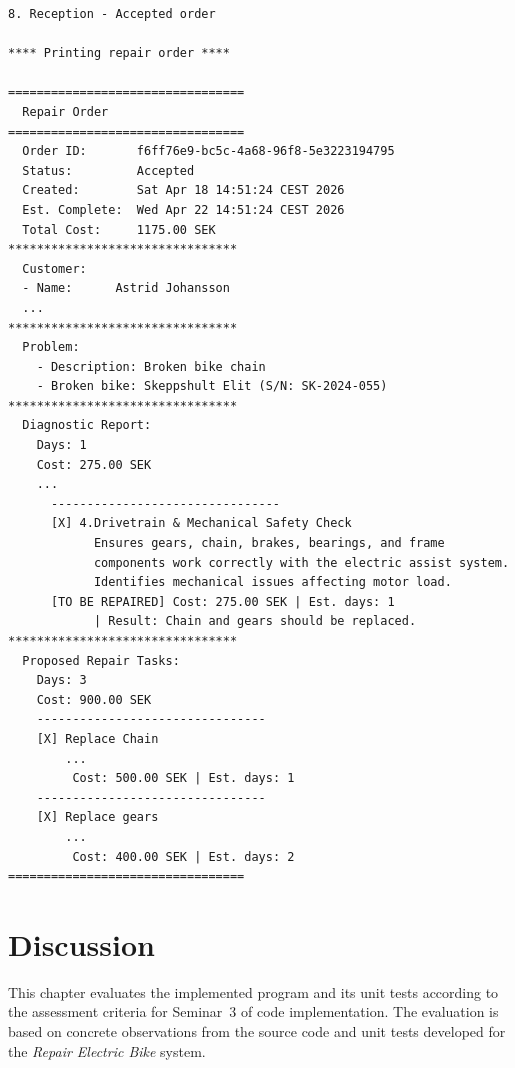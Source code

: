 \documentclass[a4paper]{scrartcl}
\begin{document}
\begin{lstlisting}[style=outputstyle, caption={Sample output from program execution}, label={fig:}]
8. Reception - Accepted order

**** Printing repair order ****

=================================
  Repair Order
=================================
  Order ID:       f6ff76e9-bc5c-4a68-96f8-5e3223194795
  Status:         Accepted
  Created:        Sat Apr 18 14:51:24 CEST 2026
  Est. Complete:  Wed Apr 22 14:51:24 CEST 2026
  Total Cost:     1175.00 SEK
********************************
  Customer:
  - Name:      Astrid Johansson
  ...
********************************
  Problem:
    - Description: Broken bike chain
    - Broken bike: Skeppshult Elit (S/N: SK-2024-055)
********************************
  Diagnostic Report:
    Days: 1
    Cost: 275.00 SEK
    ...
      --------------------------------
      [X] 4.Drivetrain & Mechanical Safety Check
            Ensures gears, chain, brakes, bearings, and frame
            components work correctly with the electric assist system.
            Identifies mechanical issues affecting motor load.
      [TO BE REPAIRED] Cost: 275.00 SEK | Est. days: 1
            | Result: Chain and gears should be replaced.
********************************
  Proposed Repair Tasks:
    Days: 3
    Cost: 900.00 SEK
    --------------------------------
    [X] Replace Chain
        ...
         Cost: 500.00 SEK | Est. days: 1
    --------------------------------
    [X] Replace gears
        ...
         Cost: 400.00 SEK | Est. days: 2
=================================
\end{lstlisting}

\section{Discussion}


This chapter evaluates the implemented program and its unit tests according to the assessment criteria for Seminar~3 of code implementation. The evaluation is based on concrete observations from the source code and unit tests developed for the \textit{Repair Electric Bike} system.
\end{document}
